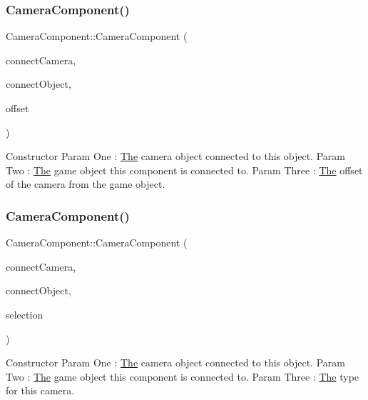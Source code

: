 \subsubsection{\texorpdfstring{Camera\+Component()}{CameraComponent()}\hspace{0.1cm}{\footnotesize\ttfamily [2/4]}}
{\footnotesize\ttfamily Camera\+Component\+::\+Camera\+Component (\begin{DoxyParamCaption}\item[{\mbox{\hyperlink{class_camera}{Camera}} $\ast$}]{connect\+Camera,  }\item[{\mbox{\hyperlink{class_game_object}{Game\+Object}} $\ast$}]{connect\+Object,  }\item[{glm\+::vec3}]{offset }\end{DoxyParamCaption})\hspace{0.3cm}{\ttfamily [inline]}}

Constructor Param One \+: \mbox{\hyperlink{class_the}{The}} camera object connected to this object. Param Two \+: \mbox{\hyperlink{class_the}{The}} game object this component is connected to. Param Three \+: \mbox{\hyperlink{class_the}{The}} offset of the camera from the game object. \mbox{\label{class_camera_component_a05759ae68f3830c8b79314640ad1471c}} 
\subsubsection{\texorpdfstring{Camera\+Component()}{CameraComponent()}\hspace{0.1cm}{\footnotesize\ttfamily [3/4]}}
{\footnotesize\ttfamily Camera\+Component\+::\+Camera\+Component (\begin{DoxyParamCaption}\item[{\mbox{\hyperlink{class_camera}{Camera}} $\ast$}]{connect\+Camera,  }\item[{\mbox{\hyperlink{class_game_object}{Game\+Object}} $\ast$}]{connect\+Object,  }\item[{\mbox{\hyperlink{_camera_component_8h_ab07ecb557631c59d8b7ec9c3db110dd5}{camera\+Type}}}]{selection }\end{DoxyParamCaption})\hspace{0.3cm}{\ttfamily [inline]}}

Constructor Param One \+: \mbox{\hyperlink{class_the}{The}} camera object connected to this object. Param Two \+: \mbox{\hyperlink{class_the}{The}} game object this component is connected to. Param Three \+: \mbox{\hyperlink{class_the}{The}} type for this camera. \mbox{\label{class_camera_component_aab0e46dcfc4a845c7373fe1142d4c981}} 
